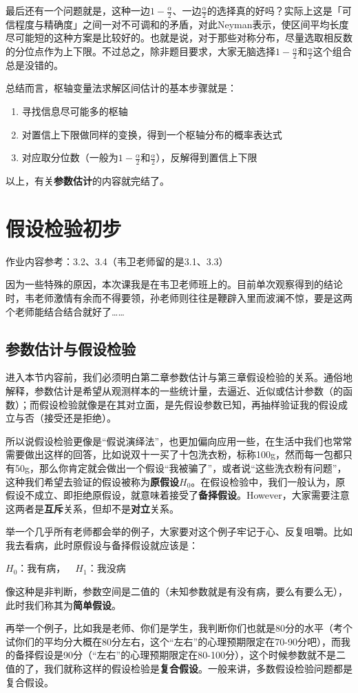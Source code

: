 \documentclass[10pt, a4paper]{article}
\begin{document}
最后还有一个问题就是，这种一边$1-\frac{\alpha}{2}$、一边$\frac{\alpha}{2}$的选择真的好吗？实际上这是「可信程度与精确度」之间一对不可调和的矛盾，对此Neyman表示，使区间平均长度尽可能短的这种方案是比较好的。也就是说，对于那些对称分布，尽量选取相反数的分位点作为上下限。不过总之，除非题目要求，大家无脑选择$1-\frac{\alpha}{2}$和$\frac{\alpha}{2}$这个组合总是没错的。\\\par
总结而言，枢轴变量法求解区间估计的基本步骤就是：
\begin{enumerate}
    \item 寻找信息尽可能多的枢轴
    \item 对置信上下限做同样的变换，得到一个枢轴分布的概率表达式
    \item 对应取分位数（一般为$1-\frac{\alpha}{2}$和$\frac{\alpha}{2}$），反解得到置信上下限
\end{enumerate}

以上，有关\textbf{参数估计}的内容就完结了。

\section{假设检验初步}
作业内容参考：3.2、3.4（韦卫老师留的是3.1、3.3）\par
因为一些特殊的原因，本次课我是在韦卫老师班上的。目前单次观察得到的结论时，韦老师激情有余而不得要领，孙老师则往往是鞭辟入里而波澜不惊，要是这两个老师能结合结合就好了……

\subsection{参数估计与假设检验}
进入本节内容前，我们必须明白第二章参数估计与第三章假设检验的关系。通俗地解释，参数估计是希望从观测样本的一些统计量，去逼近、近似或估计参数（的函数）；而假设检验就像是在其对立面，是先假设参数已知，再抽样验证我的假设成立与否（接受还是拒绝）。\par
所以说假设检验更像是“假说演绎法”，也更加偏向应用一些，在生活中我们也常常需要做出这样的回答，比如说双十一买了十包洗衣粉，标称100g，然而每一包都只有50g，那么你肯定就会做出一个假设“我被骗了”，或者说“这些洗衣粉有问题”，这种我们希望去验证的假设被称为\textbf{原假设$H_0$}。在假设检验中，我们一般认为，原假设不成立、即拒绝原假设，就意味着接受了\textbf{备择假设}。However，大家需要注意这两者是\textbf{互斥}关系，但却不是\textbf{对立}关系。\par

举一个几乎所有老师都会举的例子，大家要对这个例子牢记于心、反复咀嚼。比如我去看病，此时原假设与备择假设就应该是：
\begin{center}
    $H_0$：我有病，~~$H_1$：我没病
\end{center} \par
像这种是非判断，参数空间是二值的（未知参数就是有没有病，要么有要么无），此时我们称其为\textbf{简单假设}。\par
再举一个例子，比如我是老师、你们是学生，我判断你们也就是80分的水平（考个试你们的平均分大概在80分左右，这个“左右”的心理预期限定在70-90分吧），而我的备择假设是90分（“左右”的心理预期限定在80-100分），这个时候参数就不是二值的了，我们就称这样的假设检验是\textbf{复合假设}。一般来讲，多数假设检验问题都是复合假设。\par
\end{document}
